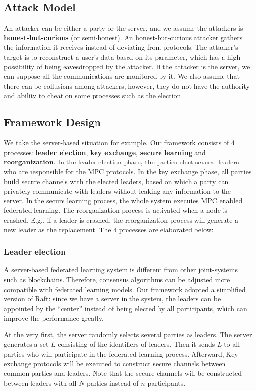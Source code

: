 \subsection{Attack Model}
An attacker can be either a party or the server, and we assume the attackers is \textbf{honest-but-curious} (or semi-honest). An honest-but-curious attacker gathers the information it receives instead of deviating from protocols. The attacker's target is to reconstruct a user's data based on its parameter, which has a high possibility of being eavesdropped by the attacker. If the attacker is the server, we can suppose all the communications are monitored by it. We also assume that there can be collusions among attackers, however, they do not have the authority and ability to cheat on some processes such as the election.

\subsection{Framework Design}
We take the server-based situation for example. Our framework consists of 4 processes: \textbf{leader election}, \textbf{key exchange}, \textbf{secure learning} and \textbf{reorganization}. In the leader election phase, the parties elect several leaders who are responsible for the MPC protocols. In the key exchange phase, all parties build secure channels with the elected leaders, based on which a party can privately communicate with leaders without leaking any information to the server. In the secure learning process, the whole system executes MPC enabled federated learning. The reorganization process is activated when a node is crashed. E.g., if a leader is crashed, the reorganization process will generate a new leader as the replacement. The 4 processes are elaborated below:

\subsubsection{\textbf{Leader election}}
A server-based federated learning system is different from other joint-systems such as blockchains. Therefore, consensus algorithms can be adjusted more compatible with federated learning models. Our framework adopted a simplified version of Raft: since we have a server in the system, the leaders can be appointed by the ``center'' instead of being elected by all participants, which can improve the performance greatly. 

At the very first, the server randomly selects several parties as leaders. The server generates a set $L$ consisting of the identifiers of leaders. Then it sends $L$ to all parties who will participate in the federated learning process. Afterward, Key exchange protocols will be executed to construct secure channels between common parties and leaders. Note that the secure channels will be constructed between leaders with all $N$ parties instead of $n$ participants.

